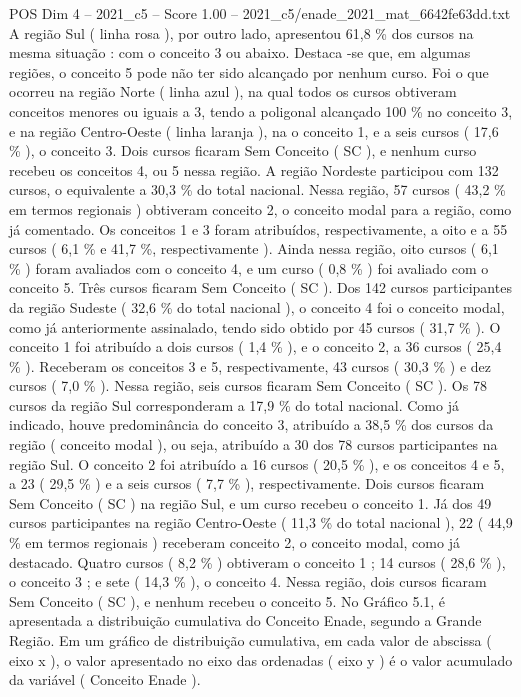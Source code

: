 \begin{textsample}{POS Dim 4 – 2021\_c5 – Score 1.00 – 2021\_c5/enade\_2021\_mat\_6642fe63dd.txt}
A região Sul ( linha rosa ), por outro lado, apresentou 61,8 \% dos cursos na mesma situação : com o conceito 3 ou abaixo.
Destaca -se que, em algumas regiões, o conceito 5 pode não ter sido alcançado por nenhum curso.
Foi o que ocorreu na região Norte ( linha azul ), na qual todos os cursos obtiveram conceitos menores ou iguais a 3, tendo a poligonal alcançado 100 \% no conceito 3, e na região Centro-Oeste ( linha laranja ), na o conceito 1, e a seis cursos ( 17,6 \% ), o conceito 3.
Dois cursos ficaram Sem Conceito ( SC ), e nenhum curso recebeu os conceitos 4, ou 5 nessa região.
A região Nordeste participou com 132 cursos, o equivalente a 30,3 \% do total nacional.
Nessa região, 57 cursos ( 43,2 \% em termos regionais ) obtiveram conceito 2, o conceito modal para a região, como já comentado.
Os conceitos 1 e 3 foram atribuídos, respectivamente, a oito e a 55 cursos ( 6,1 \% e 41,7 \%, respectivamente ).
Ainda nessa região, oito cursos ( 6,1 \% ) foram avaliados com o conceito 4, e um curso ( 0,8 \% ) foi avaliado com o conceito 5.
Três cursos ficaram Sem Conceito ( SC ).
Dos 142 cursos participantes da região Sudeste ( 32,6 \% do total nacional ), o conceito 4 foi o conceito modal, como já anteriormente assinalado, tendo sido obtido por 45 cursos ( 31,7 \% ).
O conceito 1 foi atribuído a dois cursos ( 1,4 \% ), e o conceito 2, a 36 cursos ( 25,4 \% ).
Receberam os conceitos 3 e 5, respectivamente, 43 cursos ( 30,3 \% ) e dez cursos ( 7,0 \% ).
Nessa região, seis cursos ficaram Sem Conceito ( SC ).
Os 78 cursos da região Sul corresponderam a 17,9 \% do total nacional.
Como já indicado, houve predominância do conceito 3, atribuído a 38,5 \% dos cursos da região ( conceito modal ), ou seja, atribuído a 30 dos 78 cursos participantes na região Sul.
O conceito 2 foi atribuído a 16 cursos ( 20,5 \% ), e os conceitos 4 e 5, a 23 ( 29,5 \% ) e a seis cursos ( 7,7 \% ), respectivamente.
Dois cursos ficaram Sem Conceito ( SC ) na região Sul, e um curso recebeu o conceito 1.
Já dos 49 cursos participantes na região Centro-Oeste ( 11,3 \% do total nacional ), 22 ( 44,9 \% em termos regionais ) receberam conceito 2, o conceito modal, como já destacado.
Quatro cursos ( 8,2 \% ) obtiveram o conceito 1 ; 14 cursos ( 28,6 \% ), o conceito 3 ; e sete ( 14,3 \% ), o conceito 4.
Nessa região, dois cursos ficaram Sem Conceito ( SC ), e nenhum recebeu o conceito 5.
No Gráfico 5.1, é apresentada a distribuição cumulativa do Conceito Enade, segundo a Grande Região.
Em um gráfico de distribuição cumulativa, em cada valor de abscissa ( eixo x ), o valor apresentado no eixo das ordenadas ( eixo y ) é o valor acumulado da variável ( Conceito Enade ).

\end{textsample}
